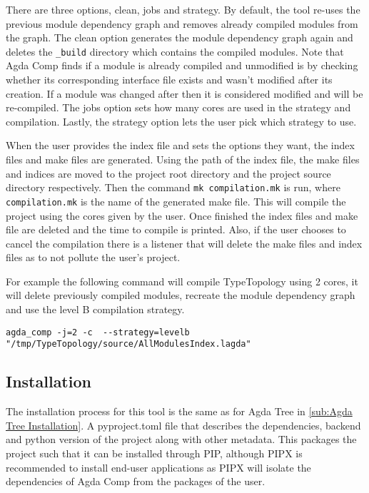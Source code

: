 There are three options, clean, jobs and strategy. By default, the tool re-uses
the previous module dependency graph and removes already compiled modules from
the graph. The clean option generates the module dependency graph again and
deletes the \texttt{\_build} directory which contains the compiled modules.
Note that Agda Comp finds if a module is already compiled and unmodified is by
checking whether its corresponding interface file exists and wasn't modified
after its creation. If a module was changed after then it is considered
modified and will be re-compiled. The jobs option sets how many cores are used
in the strategy and compilation. Lastly, the strategy option lets the user pick
which strategy to use.

When the user provides the index file and sets the options they want, the index
files and make files are generated. Using the path of the index file, the make
files and indices are moved to the project root directory and the project
source directory respectively. Then the command \texttt{mk compilation.mk} is
run, where \texttt{compilation.mk} is the name of the generated make file. This
will compile the project using the cores given by the user. Once finished the
index files and make file are deleted and the time to compile is printed. Also,
if the user chooses to cancel the compilation there is a listener that will
delete the make files and index files as to not pollute the user's project.

For example the following command will compile TypeTopology using 2 cores, it
will delete previously compiled modules, recreate the module dependency graph
and use the level B compilation strategy.

\begin{lstlisting}
agda_comp -j=2 -c  --strategy=levelb "/tmp/TypeTopology/source/AllModulesIndex.lagda"
\end{lstlisting}

\subsection{Installation}

The installation process for this tool is the same as for Agda Tree in 
\cref{sub:Agda Tree Installation}. A pyproject.toml file that describes
the dependencies, backend and python version of the project along with
other metadata. This packages the project such that it can be installed through
PIP, although PIPX is recommended to install end-user applications as PIPX will
isolate the dependencies of Agda Comp from the packages of the user.

